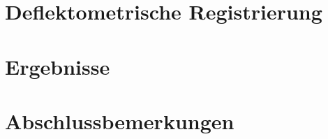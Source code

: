 \documentclass[ngerman,11pt,a4paper]{report}
\begin{document}
	{
		\FloatBarrier %
		\chapter{Deflektometrische Registrierung}
		\label{chp:deflektometrischeRegistrierung}
		
	}
	
	{
		\FloatBarrier %
		\chapter{Ergebnisse}
		\label{chp:ergebnisse}
		
	}
	
	{
		\FloatBarrier %
		\chapter{Abschlussbemerkungen}
		\label{chp:abschlussbemerkungen}
		
	}
	
	{
		\FloatBarrier %
		\newpage
		\printbibliography[title = Quellenverzeichnis]
	}
\end{document}
